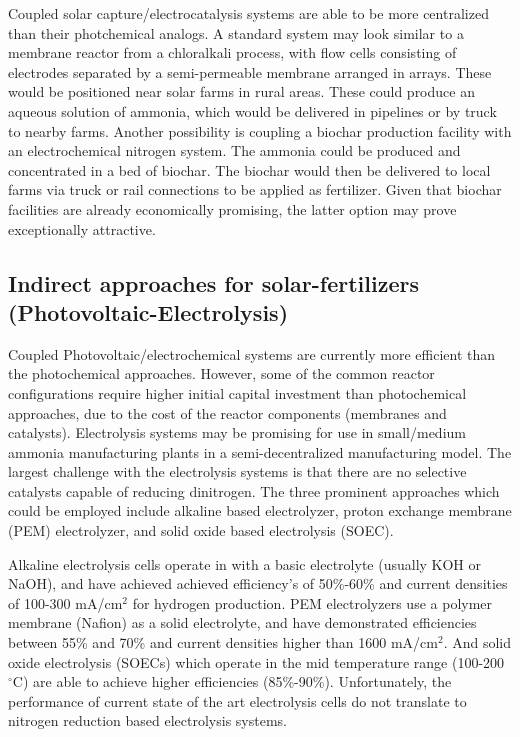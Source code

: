 Coupled solar capture/electrocatalysis systems are able to be more centralized than their photchemical analogs. A standard system may look similar to a membrane reactor from a chloralkali process, with flow cells consisting of electrodes separated by a semi-permeable membrane arranged in arrays.\cite{} These would be positioned near solar farms in rural areas. These could produce an aqueous solution of ammonia, which would be delivered in pipelines or by truck to nearby farms. Another possibility is coupling a biochar production facility with an electrochemical nitrogen system. The ammonia could be produced and concentrated in a bed of biochar. The biochar would then be delivered to local farms via truck or rail connections to be applied as fertilizer. Given that biochar facilities are already economically promising, the latter option may prove exceptionally attractive.\cite{Galinato2011}

\subsection*{Indirect approaches for solar-fertilizers (Photovoltaic-Electrolysis)}

Coupled Photovoltaic/electrochemical systems are currently more efficient than the photochemical approaches. However, some of the common reactor configurations require higher initial capital investment than photochemical approaches, due to the cost of the reactor components (membranes and catalysts). Electrolysis systems may be promising for use in small/medium ammonia manufacturing plants in a semi-decentralized manufacturing model. The largest challenge with the electrolysis systems is that there are no selective catalysts capable of reducing dinitrogen. The three prominent approaches which could be employed include alkaline based electrolyzer, proton exchange membrane (PEM) electrolyzer, and solid oxide based electrolysis (SOEC). 

Alkaline electrolysis cells operate in with a basic electrolyte (usually KOH or NaOH), and have achieved achieved efficiency's of 50\%-60\% and current densities of 100-300 mA/cm$^2$ for hydrogen production. PEM electrolyzers use a polymer membrane (Nafion) as a solid electrolyte, and have demonstrated efficiencies between 55\% and 70\% and current densities higher than 1600 mA/cm$^2$. And solid oxide electrolysis (SOECs) which operate in the mid temperature range (100-200 $^\circ$C) are able to achieve higher efficiencies (85\%-90\%). Unfortunately, the performance of current state of the art electrolysis cells do not translate to nitrogen reduction based electrolysis systems. 


